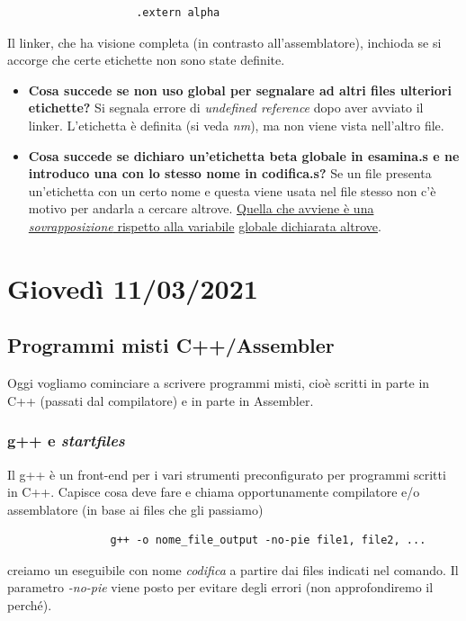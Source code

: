 \begin{itemize}
				\begin{verbatim}
					.extern alpha
				\end{verbatim}
				Il linker, che ha visione completa (in contrasto all'assemblatore), inchioda se si accorge che certe etichette non sono state definite.
				\begin{itemize}
					\item \textbf{Cosa succede se non uso global per segnalare ad altri files ulteriori etichette?} Si segnala errore di \emph{undefined reference} dopo aver avviato il linker. L'etichetta è definita (si veda \emph{nm}), ma non viene vista nell'altro file.
					\item \textbf{Cosa succede se dichiaro un'etichetta beta globale in esamina.s e ne introduco una con lo stesso nome in codifica.s?} Se un file presenta un'etichetta con un certo nome e questa viene usata nel file stesso non c'è motivo per andarla a cercare altrove. \underline{Quella che avviene è una \emph{sovrapposizione} rispetto alla variabile} \underline{globale dichiarata altrove}.
				\end{itemize}
			\end{itemize}
			
			\chapter{Giovedì 11/03/2021}
			\section{Programmi misti C++/Assembler}
			Oggi vogliamo cominciare a scrivere programmi misti, cioè scritti in parte in C++ (passati dal compilatore) e in parte in Assembler. 
			
			\subsection{g++ e \emph{startfiles}} Il g++ è un front-end per i vari strumenti preconfigurato per programmi scritti in C++. Capisce cosa deve fare e chiama opportunamente compilatore e/o assemblatore (in base ai files che gli passiamo)
			\begin{verbatim}
				g++ -o nome_file_output -no-pie file1, file2, ...
			\end{verbatim}
			creiamo un eseguibile con nome \emph{codifica} a partire dai files indicati nel comando. Il parametro \emph{-no-pie} viene posto per evitare degli errori (non approfondiremo il perché).  
